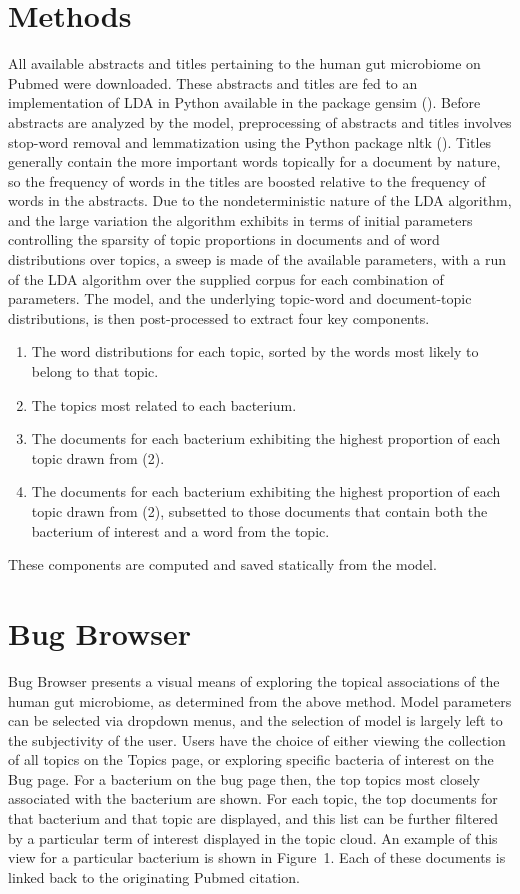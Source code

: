\documentclass{bioinfo}
\begin{document}
\section{Methods}
All available abstracts and titles pertaining to the human gut microbiome on Pubmed were downloaded. These abstracts and titles are fed to an implementation of LDA in Python available in the package gensim (\citealp{gensim10}). Before abstracts are analyzed by the model, preprocessing of abstracts and titles involves stop-word removal and lemmatization using the Python package nltk (\citealp{nltk09}). Titles generally contain the more important words topically for a document by nature, so the frequency of words in the titles are boosted relative to the frequency of words in the abstracts. Due to the nondeterministic nature of the LDA algorithm, and the large variation the algorithm exhibits in terms of initial parameters controlling the sparsity of topic proportions in documents and of word distributions over topics, a sweep is made of the available parameters, with a run of the LDA algorithm over the supplied corpus for each combination of parameters. The model, and the underlying topic-word and document-topic distributions, is then post-processed to extract four key components. \\
\begin{enumerate}
\item The word distributions for each topic, sorted by the words most likely to belong to that topic.
\item The topics most related to each bacterium.
\item The documents for each bacterium exhibiting the highest proportion of each topic drawn from (2).
\item The documents for each bacterium exhibiting the highest proportion of each topic drawn from (2), subsetted to those documents that contain both the bacterium of interest and a word from the topic.
\end{enumerate}
These components are computed and saved statically from the model. 
\section{Bug Browser}
Bug Browser presents a visual means of exploring the topical associations of the human gut microbiome, as determined from the above method. Model parameters can be selected via dropdown menus, and the selection of model is largely left to the subjectivity of the user. Users have the choice of either viewing the collection of all topics on the Topics page, or exploring specific bacteria of interest on the Bug page. For a bacterium on the bug page then, the top topics most closely associated with the bacterium are shown. For each topic, the top documents for that bacterium and that topic are displayed, and this list can be further filtered by a particular term of interest displayed in the topic cloud. An example of this view for a particular bacterium is shown in Figure~1\vphantom{\ref{fig:01}}. Each of these documents is linked back to the originating Pubmed citation. 
\end{document}
